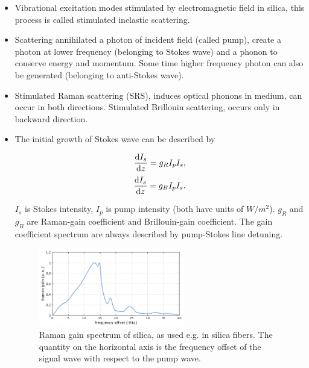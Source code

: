 \documentclass[12pt]{extarticle}
\numberwithin{equation}{section}
\numberwithin{figure}{section}
\numberwithin{table}{section}
\newcommand{\<}{\langle}
\renewcommand{\>}{\rangle}
\theoremstyle{definition}
\begin{document}
            \begin{itemize}
                \item Vibrational excitation modes stimulated by electromagnetic field in silica, this process is called stimulated inelastic scattering.
                \item Scattering annihilated a photon of incident field (called pump), create a photon at lower frequency (belonging to Stokes wave) and a phonon to conserve energy and momentum. Some time higher frequency photon can also be generated (belonging to anti-Stokes wave).
                \item Stimulated Raman scattering (SRS), induces optical phonons in  medium, can occur in both directions. Stimulated Brillouin scattering, occurs only in backward direction.
                \item The initial growth of Stokes wave can be described by
                    \begin{multicols}{2}
                    \setlength{\columnseprule}{0pt}
                    \noindent
                        \begin{equation}
                            \dv{I_s}{z} = g_R I_p I_s,
                        \end{equation}
                        \begin{equation}
                            \dv{I_s}{z} = g_B I_p I_s.
                        \end{equation}
                    \end{multicols}
                    $I_s$ is Stokes intensity, $I_p$ is pump intensity (both have units of $W/m^2$). $g_R$ and $g_B$ are Raman-gain coefficient and Brillouin-gain coefficient. The gain coefficient spectrum are always described by pump-Stokes line detuning. 
                    \begin{figure}[htbp]
                        \centering
                        \includegraphics[width=0.6\textwidth]{images/raman_gain.png}
                        \caption{Raman gain spectrum of silica, as used e.g. in silica fibers. The quantity on the horizontal axis is the frequency offset of the signal wave with respect to the pump wave.\cite{hollenbeck_multiple-vibrational-mode_2002, paschotta_raman_nodate}}

\end{figure}
\end{itemize}
\end{document}
